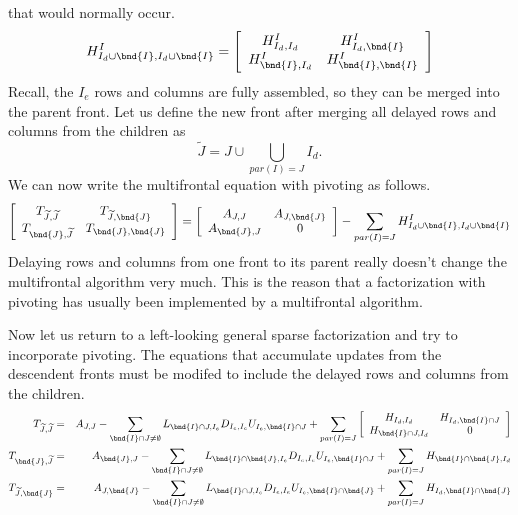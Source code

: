 that would normally occur.
$$
H^I_{I_d \cup \bnd{I}, I_d \cup \bnd{I}} 
=
\left \lbrack \begin{array}{cc}
H^I_{I_d,I_d}     & H^I_{I_d, \bnd{I}} \\
H^I_{\bnd{I},I_d} & H^I_{\bnd{I},\bnd{I}}
\end{array} \right \rbrack
$$
Recall, the $I_e$ rows and columns are fully assembled, so they can
be merged into the parent front. Let us define the new front after
merging all delayed rows and columns from the children as
$$
{\widetilde J} = J \cup \bigcup_{par(I) = J } I_d.
$$
We can now write the multifrontal equation with pivoting as follows.
\begin{equation}
\label{alg:eqn:mf-pivoting}
\left \lbrack \begin{array}{cc}
T_{{\widetilde J},{\widetilde J}} & T_{{\widetilde J}, \bnd{J}} \\
T_{\bnd{J},{\widetilde J}} & T_{\bnd{J},\bnd{J}}
\end{array} \right \rbrack
= 
\left \lbrack \begin{array}{cc}
A_{J,J} & A_{J, \bnd{J}} \\
A_{\bnd{J},J} & 0
\end{array} \right \rbrack
- 
\sum_{par(I) = J}
H_{I_d \cup \bnd{I}, I_d \cup \bnd{I}}^I
\end{equation}
Delaying rows and columns from one front to its parent really
doesn't change the multifrontal algorithm very much.
This is the reason that a factorization with pivoting has usually
been implemented by a multifrontal algorithm.
\par
Now let us return to a left-looking general sparse factorization
and try to incorporate pivoting.
The equations that accumulate updates from the descendent fronts
must be modifed to include the delayed rows and columns from the
children.
\begin{eqnarray*}
T_{{\widetilde J},{\widetilde J}} & = & A_{J,J}
- \sum_{\bnd{I} \cap J \ne \emptyset} 
L_{\bnd{I} \cap J, I_e} 
D_{I_e, I_e} 
U_{I_e, \bnd{I} \cap J}
+ \sum_{par(I) = J} 
\left \lbrack \begin{array}{cc}
H_{I_d, I_d} & H_{I_d, \bnd{I} \cap J} \\
H_{\bnd{I} \cap J, I_d} & 0 \\
\end{array} \right \rbrack
\\
T_{\bnd{J},{\widetilde J}} & = & A_{\bnd{J},J}
- \sum_{\bnd{I} \cap J \ne \emptyset} 
L_{\bnd{I} \cap \bnd{J}, I_e} D_{I_e, I_e} U_{I_e, \bnd{I} \cap J}
+ \sum_{par(I) = J} H_{\bnd{I} \cap \bnd{J}, I_d}
\\
T_{{\widetilde J},\bnd{J}} & = & A_{J,\bnd{J}}
- \sum_{\bnd{I} \cap J \ne \emptyset} 
L_{\bnd{I} \cap J, I_e} D_{I_e, I_e} U_{I_e, \bnd{I} \cap \bnd{J}}
+ \sum_{par(I) = J} H_{I_d, \bnd{I} \cap \bnd{J}}
\end{eqnarray*}
